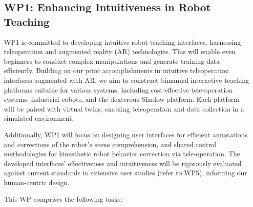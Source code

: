 \documentclass{erc-B2}
\begin{document}
\subsection{WP1: Enhancing Intuitiveness in Robot Teaching}
WP1 is committed to developing intuitive robot teaching interfaces, harnessing teleoperation and augmented reality (AR) technologies. This will enable even beginners to conduct complex manipulations and generate training data efficiently. Building on our prior accomplishments in intuitive teleoperation interfaces augmented with AR, we aim to construct bimanual interactive teaching platforms suitable for various systems, including cost-effective tele-operation systems, industrial cobots, and the dexterous Shadow platform. Each platform will be paired with virtual twins, enabling teleoperation and data collection in a simulated environment.

Additionally, WP1 will focus on designing user interfaces for efficient annotations and corrections of the robot’s scene comprehension, and shared control methodologies for kinesthetic robot behavior correction via tele-operation. The developed interfaces' effectiveness and intuitiveness will be rigorously evaluated against current standards in extensive user studies (refer to WP5), informing our human-centric design.

This WP comprises the following tasks:
\end{document}
